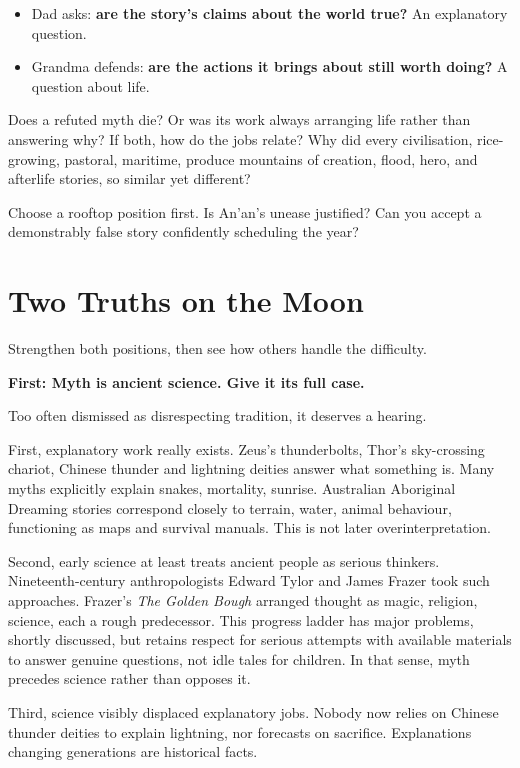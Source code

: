 \begin{itemize}
\item Dad asks: \textbf{are the story's claims about the world true?} An explanatory question.
\item Grandma defends: \textbf{are the actions it brings about still worth doing?} A question about life.
\end{itemize}
Does a refuted myth die? Or was its work always arranging life rather than answering why? If both, how do the jobs relate? Why did every civilisation, rice-growing, pastoral, maritime, produce mountains of creation, flood, hero, and afterlife stories, so similar yet different?

Choose a rooftop position first. Is An'an's unease justified? Can you accept a demonstrably false story confidently scheduling the year?

\section{Two Truths on the Moon}
Strengthen both positions, then see how others handle the difficulty.

\textbf{First: Myth is ancient science. Give it its full case.}

Too often dismissed as disrespecting tradition, it deserves a hearing.

First, explanatory work really exists. Zeus's thunderbolts, Thor's sky-crossing chariot, Chinese thunder and lightning deities answer what something is. Many myths explicitly explain snakes, mortality, sunrise. Australian Aboriginal Dreaming stories correspond closely to terrain, water, animal behaviour, functioning as maps and survival manuals. This is not later overinterpretation.

Second, early science at least treats ancient people as serious thinkers. Nineteenth-century anthropologists Edward Tylor and James Frazer took such approaches. Frazer's \textit{The Golden Bough} arranged thought as magic, religion, science, each a rough predecessor. This progress ladder has major problems, shortly discussed, but retains respect for serious attempts with available materials to answer genuine questions, not idle tales for children. In that sense, myth precedes science rather than opposes it.

Third, science visibly displaced explanatory jobs. Nobody now relies on Chinese thunder deities to explain lightning, nor forecasts on sacrifice. Explanations changing generations are historical facts.

